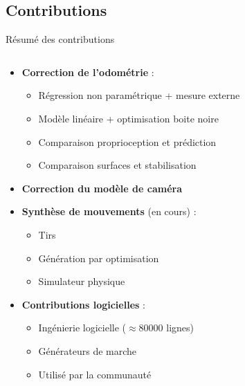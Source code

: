 
\subsection{Contributions}

\begin{frame}{Résumé des contributions}
    \begin{columns}
        \begin{column}{0.55\linewidth}
            \begin{itemize}
                \item \textbf{Correction de l'odométrie} :
                    \begin{itemize}
                        \item Régression non paramétrique + mesure externe
                        \item Modèle linéaire + optimisation boite noire
                        \item Comparaison proprioception et prédiction
                        \item Comparaison surfaces et stabilisation
                    \end{itemize}
                \item \textbf{Correction du modèle de caméra}
                \item \textbf{Synthèse de mouvements} (en cours) :
                    \begin{itemize}
                        \item Tirs
                        \item Génération par optimisation
                        \item Simulateur physique
                    \end{itemize}
                \item \textbf{Contributions logicielles} :
                    \begin{itemize}
                        \item Ingénierie logicielle ($\approx80000$ lignes)
                        \item Générateurs de marche
                        \item Utilisé par la communauté
                    \end{itemize}
            \end{itemize}
        \end{column}
        \begin{column}{0.45\linewidth}
            \centering
        \end{column}
    \end{columns}
\end{frame}

